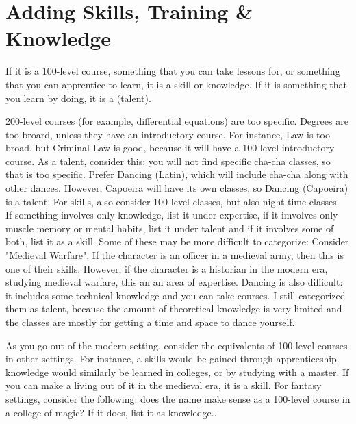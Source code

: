 \documentclass{LegrandOrangeTufteBook}
\newcommand{\term}[1]{\textcolor{colorTerm}{#1}}
\begin{document}
\section*{Adding Skills, Training \& Knowledge}
If it is a 100-level course, something that you can take lessons for, or something that you can apprentice to learn, it is a \term{skill} or \term{knowledge}. If it is something that you learn by doing, it is a \term(talent).

200-level courses (for example, differential equations) are too specific. Degrees are too broard, unless they have an introductory course. For instance, Law is too broad, but Criminal Law is good, because it will have a 100-level introductory course. As a \term{talent}, consider this: you will not find specific cha-cha classes, so that is too specific. Prefer Dancing (Latin), which will include cha-cha along with other dances. However, Capoeira will have its own classes, so Dancing (Capoeira) is a \term{talent}. For skills, also consider 100-level classes, but also night-time classes.\\

If something involves only knowledge, list it under \term{expertise}, if it imvolves only muscle memory or mental habits, list it under \term{talent} and if it involves some of both, list it as a skill. Some of these may be more difficult to categorize: Consider "Medieval Warfare". If the character is an officer in a medieval army, then this is one of their \term{skill}s. However, if the character is a historian in the modern era, studying medieval warfare, this an an area of \term{expertise}. Dancing is also difficult: it includes some technical knowledge and you can take courses. I still categorized them as \term{talent}, because the amount of theoretical knowledge is very limited and the classes are mostly for getting a time and space to dance yourself.

As you go out of the modern setting, consider the equivalents of 100-level courses in other settings. For instance, a \term{skill}s would be gained through apprenticeship. \term{knowledge} would similarly be learned in colleges, or by studying with a master. If you can make a living out of it in the medieval era, it is a \term{skill}. For fantasy settings, consider the following: does the name make sense as a 100-level course in a college of magic? If it does, list it as \term{knowledge}..
\end{document}
